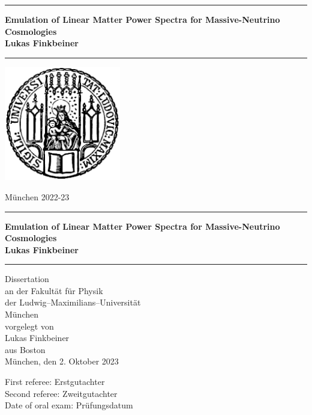 \documentclass[12pt]{book}
\newcommand{\LMUTitle}[9]{
  \thispagestyle{empty}
  \vspace*{\stretch{1}}
  {\parindent0cm
   \rule{\linewidth}{.7ex}}
  \begin{flushright}

    \vspace*{\stretch{1}}
    \sffamily\bfseries\Huge
    #1\\
    \vspace*{\stretch{1}}
    \sffamily\bfseries\large
    #2
    \vspace*{\stretch{1}}
  \end{flushright}
  \rule{\linewidth}{.7ex}
  \vspace*{\stretch{5}}
  \begin{center}
    \includegraphics[width=2in]{siegel}
  \end{center}
  \vspace*{\stretch{1}}
  \begin{center}\sffamily\LARGE{#5}\end{center}
  \newpage
  \thispagestyle{empty}

  \cleardoublepage
  \thispagestyle{empty}

  \vspace*{\stretch{1}}
  {\parindent0cm
  \rule{\linewidth}{.7ex}}
  \begin{flushright}
    \vspace*{\stretch{1}}
    \sffamily\bfseries\Huge
    #1\\
    \vspace*{\stretch{1}}
    \sffamily\bfseries\large
    #2
    \vspace*{\stretch{1}}
  \end{flushright}
  \rule{\linewidth}{.7ex}

  \vspace*{\stretch{3}}
  \begin{center}
    \Large Dissertation\\
    \Large an der #4\\
    \Large der Ludwig--Maximilians--Universit\"at\\
    \Large M\"unchen\\
    \vspace*{\stretch{1}}
    \Large vorgelegt von\\
    \Large #2\\
    \Large aus #3\\
    \vspace*{\stretch{2}}
    \Large M\"unchen, den #6
  \end{center}

  \newpage
  \thispagestyle{empty}

  \vspace*{\stretch{1}}

  \begin{flushleft}
    \large First referee:  #7 \\[1mm]
    \large Second referee: #8 \\[1mm]
    \large Date of oral exam: #9\\
  \end{flushleft}

  \cleardoublepage
}
\begin{document}
  \frontmatter
  \VerbatimFootnotes

  \LMUTitle
      {Emulation of Linear Matter Power Spectra for Massive-Neutrino Cosmologies}               %
      {Lukas Finkbeiner}                       %
      {Boston}                             %
      {Fakultät für Physik}                         %
      {M\"unchen 2022-23}                          %
      {2. Oktober 2023}                            %
      {Erstgutachter}                          %
      {Zweitgutachter}                         %
      {Pr\"ufungsdatum}                         %


  \tableofcontents


  \listoffigures


  \listoftables
  \cleardoublepage


  


  \mainmatter\setcounter{page}{1}
  
  
  
  
  
  


  \backmatter
  
  \markboth{}{}


  


\end{document}
